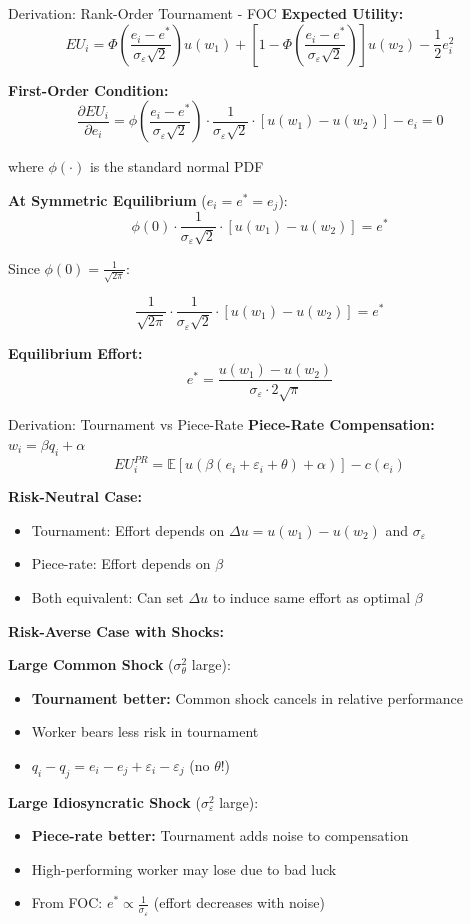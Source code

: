 \documentclass[xcolor={x11names}]{beamer}
\begin{document}
\begin{frame}{Derivation: Rank-Order Tournament - FOC}
\textbf{Expected Utility:}
$$EU_i = \Phi\left(\frac{e_i - e^*}{\sigma_\varepsilon\sqrt{2}}\right) u(w_1) + \left[1-\Phi\left(\frac{e_i - e^*}{\sigma_\varepsilon\sqrt{2}}\right)\right] u(w_2) - \frac{1}{2}e_i^2$$

\textbf{First-Order Condition:}
$$\frac{\partial EU_i}{\partial e_i} = \phi\left(\frac{e_i - e^*}{\sigma_\varepsilon\sqrt{2}}\right) \cdot \frac{1}{\sigma_\varepsilon\sqrt{2}} \cdot [u(w_1) - u(w_2)] - e_i = 0$$

where $\phi(\cdot)$ is the standard normal PDF

\textbf{At Symmetric Equilibrium} ($e_i = e^* = e_j$):
$$\phi(0) \cdot \frac{1}{\sigma_\varepsilon\sqrt{2}} \cdot [u(w_1) - u(w_2)] = e^*$$

Since $\phi(0) = \frac{1}{\sqrt{2\pi}}$:

$$\frac{1}{\sqrt{2\pi}} \cdot \frac{1}{\sigma_\varepsilon\sqrt{2}} \cdot [u(w_1) - u(w_2)] = e^*$$

\textbf{Equilibrium Effort:}
$$\boxed{e^* = \frac{u(w_1) - u(w_2)}{\sigma_\varepsilon \cdot 2\sqrt{\pi}}}$$
\end{frame}

\begin{frame}{Derivation: Tournament vs Piece-Rate}
\textbf{Piece-Rate Compensation:} $w_i = \beta q_i + \alpha$
$$EU_i^{PR} = \mathbb{E}[u(\beta(e_i + \varepsilon_i + \theta) + \alpha)] - c(e_i)$$

\textbf{Risk-Neutral Case:}
\begin{itemize}
  \item Tournament: Effort depends on $\Delta u = u(w_1) - u(w_2)$ and $\sigma_\varepsilon$
  \item Piece-rate: Effort depends on $\beta$
  \item Both equivalent: Can set $\Delta u$ to induce same effort as optimal $\beta$
\end{itemize}

\textbf{Risk-Averse Case with Shocks:}

\textbf{Large Common Shock} ($\sigma_\theta^2$ large):
\begin{itemize}
  \item \textbf{Tournament better:} Common shock cancels in relative performance
  \item Worker bears less risk in tournament
  \item $q_i - q_j = e_i - e_j + \varepsilon_i - \varepsilon_j$ (no $\theta$!)
\end{itemize}

\textbf{Large Idiosyncratic Shock} ($\sigma_\varepsilon^2$ large):
\begin{itemize}
  \item \textbf{Piece-rate better:} Tournament adds noise to compensation
  \item High-performing worker may lose due to bad luck
  \item From FOC: $e^* \propto \frac{1}{\sigma_\varepsilon}$ (effort decreases with noise)
\end{itemize}
\end{frame}
\end{document}
